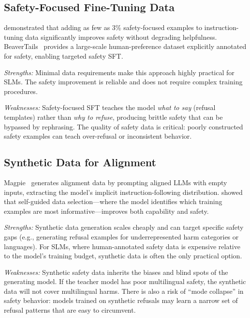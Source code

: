 \documentclass[12pt,a4paper]{article}
\begin{document}
\subsection{Safety-Focused Fine-Tuning Data}

\citet{bianchi2024safetytuned} demonstrated that adding as few as 3\% safety-focused examples to instruction-tuning data significantly improves safety without degrading helpfulness. BeaverTails~\citep{ji2023beavertails} provides a large-scale human-preference dataset explicitly annotated for safety, enabling targeted safety SFT.

\emph{Strengths:} Minimal data requirements make this approach highly practical for SLMs. The safety improvement is reliable and does not require complex training procedures.

\emph{Weaknesses:} Safety-focused SFT teaches the model \emph{what to say} (refusal templates) rather than \emph{why to refuse}, producing brittle safety that can be bypassed by rephrasing. The quality of safety data is critical: poorly constructed safety examples can teach over-refusal or inconsistent behavior.

\subsection{Synthetic Data for Alignment}

Magpie~\citep{xu2024magpie} generates alignment data by prompting aligned LLMs with empty inputs, extracting the model's implicit instruction-following distribution. \citet{li2024datacentric} showed that self-guided data selection---where the model identifies which training examples are most informative---improves both capability and safety.

\emph{Strengths:} Synthetic data generation scales cheaply and can target specific safety gaps (e.g., generating refusal examples for underrepresented harm categories or languages). For SLMs, where human-annotated safety data is expensive relative to the model's training budget, synthetic data is often the only practical option.

\emph{Weaknesses:} Synthetic safety data inherits the biases and blind spots of the generating model. If the teacher model has poor multilingual safety, the synthetic data will not cover multilingual harms. There is also a risk of ``mode collapse'' in safety behavior: models trained on synthetic refusals may learn a narrow set of refusal patterns that are easy to circumvent.
\end{document}
